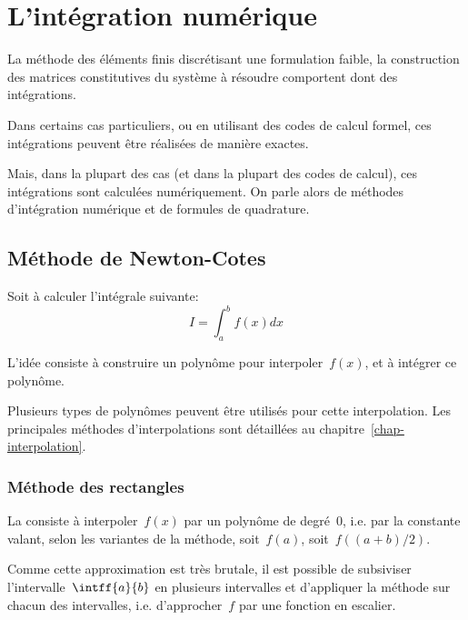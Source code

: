 \chapter{L'intégration numérique}\label{chap-quadrature}

La méthode des éléments finis discrétisant une formulation faible, la construction des matrices 
constitutives du système à résoudre comportent dont des intégrations.

Dans certains cas particuliers, ou en utilisant des codes de calcul formel, ces intégrations
peuvent être réalisées de manière exactes.

Mais, dans la plupart des cas (et dans la plupart des codes de calcul), ces
intégrations sont calculées numériquement. On parle alors de méthodes
d'intégration numérique et de formules de quadrature.






\medskip
\section{Méthode de Newton-Cotes}

Soit à calculer l'intégrale suivante:
\begin{equation}I=\int_a^b f(x)dx\end{equation}

\medskip
L'idée consiste à construire un polynôme pour interpoler~$f(x)$, et
à intégrer ce polynôme.

\medskip
Plusieurs types de polynômes peuvent être utilisés pour cette interpolation.
Les principales méthodes d'interpolations sont détaillées au chapitre~\ref{chap-interpolation}.



\medskip
\subsection*{Méthode des rectangles}

La  consiste à interpoler~$f(x)$ par un
polynôme de degré~$0$, i.e. par la constante valant, selon les variantes de la
méthode, soit~$f(a)$, soit~$f((a+b)/2)$.

\medskip
Comme cette approximation est très brutale, il est possible de subsiviser
l'intervalle~$\intff{a}{b}$ en plusieurs intervalles et d'appliquer la méthode sur chacun
des intervalles, i.e. d'approcher~$f$ par une fonction en escalier.

